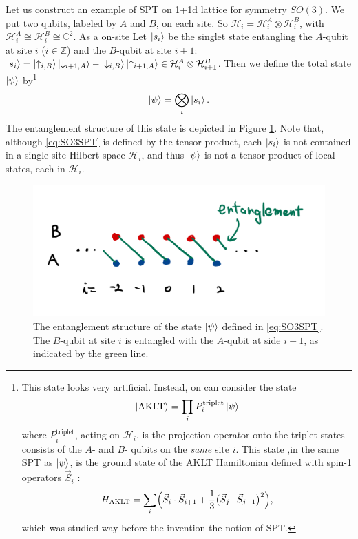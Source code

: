 \documentclass[
]{scrartcl}
\numberwithin{equation}{section}
\theoremstyle{definition}
\theoremstyle{definition}
\theoremstyle{definition}
\theoremstyle{definition}
\theoremstyle{remark}
\begin{document}
Let us construct an example of SPT on 1+1d lattice for symmetry \(SO(3)\).
We put two qubits, labeled by \(A\) and \(B\), on each site. So \(\mathcal{H}_i = \mathcal{H}^A_i \otimes \mathcal{H}^B_i\), with \(\mathcal{H}^A_i \cong \mathcal{H}^B_i \cong \mathbb{C}^2\).
As a on-site
Let \(\ket{s_i}\) be the singlet state entangling the \(A\)-qubit at site \(i\) (\(i\in\mathbb{Z}\)) and the \(B\)-qubit at site \(i+1\): \(\ket{s_i} = \ket{\uparrow_{i,B}}\ket{\downarrow_{i+1,A}} - \ket{\downarrow_{i,B}} \ket{\uparrow_{i+1,A}} \in \mathcal{H}_{i}^A\otimes \mathcal{H}_{i+1}^B\).
Then we define the total state \(\ket{\psi}\) by\footnote{This state looks very artificial. Instead, on can consider the state
  \begin{equation*}
    \label{eq:AKLT}
    \ket{\mathrm{AKLT}} = \prod_i P_i^\text{triplet} \ket{\psi}
  \end{equation*}
  where \(P_i^\text{triplet}\), acting on \(\mathcal{H}_i\), is the projection operator onto the triplet states consists of the \(A\)- and \(B\)- qubits on the \emph{same} site \(i\).
  This state ,in the same SPT as \(\ket{\psi}\), is the ground state of the AKLT Hamiltonian defined with spin-1 operators \(\vec{S}_i\) \textcite{AKLT}:
  \begin{equation*}
    \label{eq:AKLTHam}
    H_{\mathrm{AKLT}} = \sum_i \Bigl(\vec{S}_i \cdot \vec{S}_{i+1} + \frac13 \bigl(\vec{S}_{j} \cdot \vec{S}_{j+1}\bigr)^2\Bigr),
  \end{equation*}
  which was studied way before the invention the notion of SPT.}
\begin{equation}
  \label{eq:SO3SPT}
  \ket{\psi} = \bigotimes_i \ket{s_i}.
\end{equation}
The entanglement structure of this state is depicted in Figure \ref{fig:so3spt}.
Note that, although \eqref{eq:SO3SPT} is defined by the tensor product, each \(\ket{s_i}\) is not contained in a single site Hilbert space \(\mathcal{H}_i\), and thus \(\ket{\psi}\) is not a tensor product of local states, each in \(\mathcal{H}_i\).

\begin{figure}

{\centering \includegraphics[width=0.5\linewidth]{figs/so3spt} 

}

\caption{The entanglement structure of the state \(\ket{\psi}\) defined in \eqref{eq:SO3SPT}. The \(B\)-qubit at site \(i\) is entangled with the \(A\)-qubit at side \(i+1\), as indicated by the green line.}\label{fig:so3spt}
\end{figure}
\end{document}
